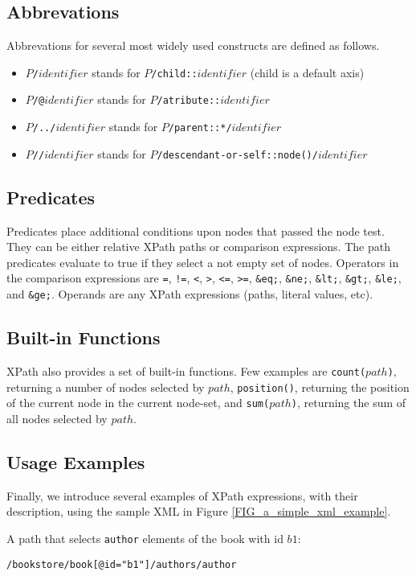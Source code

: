 \subsection{Abbrevations}
Abbrevations for several most widely used constructs are defined as follows.
\begin{itemize}
\item \texttt{$P$/$identifier$} stands for \texttt{$P$/child::$identifier$} (child is a default axis)
\item \texttt{$P$/@$identifier$} stands for \texttt{$P$/atribute::$identifier$}
\item \texttt{$P$/../$identifier$} stands for \texttt{$P$/parent::*/$identifier$}
\item \texttt{$P$//$identifier$} stands for \texttt{$P$/descendant-or-self::node()/$identifier$} 
\end{itemize}

\subsection{Predicates}
Predicates place additional conditions upon nodes that passed the node test. They can be either relative XPath paths or comparison expressions. The path predicates evaluate to true if they select a not empty set of nodes. Operators in the comparison expressions are \texttt{=}, \texttt{!=}, \texttt{<}, \texttt{>}, \texttt{<=}, \texttt{>=}, \texttt{\&eq;}, \texttt{\&ne;}, \texttt{\&lt;}, \texttt{\&gt;}, \texttt{\&le;}, and \texttt{\&ge;}. Operands are any XPath expressions (paths, literal values, etc).

\subsection{Built-in Functions}
XPath also provides a set of built-in functions. Few examples are \texttt{count($path$)}, returning a number of nodes selected by $path$, \texttt{position()}, returning the position of the current node in the current node-set, and \texttt{sum($path$)}, returning the sum of all nodes selected by $path$.

\subsection{Usage Examples}
Finally, we introduce several examples of XPath expressions, with their description, using the sample XML in Figure \ref{FIG_a_simple_xml_example}.

A path that selects \texttt{author} elements of the book with id $b1$:
\begin{alltt}
/bookstore/book[@id = "b1"]/authors/author
\end{alltt}

